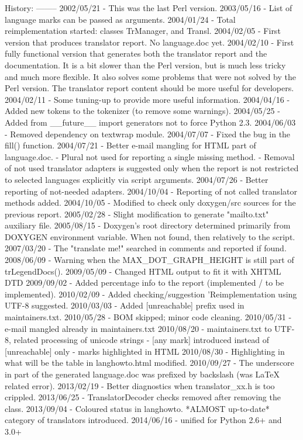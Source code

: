\begin{DoxyVerb}
  History:
  --------
  2002/05/21 - This was the last Perl version.
  2003/05/16 - List of language marks can be passed as arguments.
  2004/01/24 - Total reimplementation started: classes TrManager, and Transl.
  2004/02/05 - First version that produces translator report. No language.doc yet.
  2004/02/10 - First fully functional version that generates both the translator
   report and the documentation. It is a bit slower than the
   Perl version, but is much less tricky and much more flexible.
   It also solves some problems that were not solved by the Perl
   version. The translator report content should be more useful
   for developers.
  2004/02/11 - Some tuning-up to provide more useful information.
  2004/04/16 - Added new tokens to the tokenizer (to remove some warnings).
  2004/05/25 - Added from __future__ import generators not to force Python 2.3.
  2004/06/03 - Removed dependency on textwrap module.
  2004/07/07 - Fixed the bug in the fill() function.
  2004/07/21 - Better e-mail mangling for HTML part of language.doc.
 - Plural not used for reporting a single missing method.
 - Removal of not used translator adapters is suggested only
   when the report is not restricted to selected languages
   explicitly via script arguments.
  2004/07/26 - Better reporting of not-needed adapters.
  2004/10/04 - Reporting of not called translator methods added.
  2004/10/05 - Modified to check only doxygen/src sources for the previous report.
  2005/02/28 - Slight modification to generate "mailto.txt" auxiliary file.
  2005/08/15 - Doxygen's root directory determined primarily from DOXYGEN
   environment variable. When not found, then relatively to the script.
  2007/03/20 - The "translate me!" searched in comments and reported if found.
  2008/06/09 - Warning when the MAX_DOT_GRAPH_HEIGHT is still part of trLegendDocs().
  2009/05/09 - Changed HTML output to fit it with XHTML DTD
  2009/09/02 - Added percentage info to the report (implemented / to be implemented).
  2010/02/09 - Added checking/suggestion 'Reimplementation using UTF-8 suggested.
  2010/03/03 - Added [unreachable] prefix used in maintainers.txt.
  2010/05/28 - BOM skipped; minor code cleaning.
  2010/05/31 - e-mail mangled already in maintainers.txt
  2010/08/20 - maintainers.txt to UTF-8, related processing of unicode strings
 - [any mark] introduced instead of [unreachable] only
 - marks highlighted in HTML
  2010/08/30 - Highlighting in what will be the table in langhowto.html modified.
  2010/09/27 - The underscore in \latexonly part of the generated language.doc
   was prefixed by backslash (was LaTeX related error).
  2013/02/19 - Better diagnostics when translator_xx.h is too crippled.
  2013/06/25 - TranslatorDecoder checks removed after removing the class.
  2013/09/04 - Coloured status in langhowto. *ALMOST up-to-date* category
   of translators introduced.
  2014/06/16 - unified for Python 2.6+ and 3.0+\end{DoxyVerb}
 

